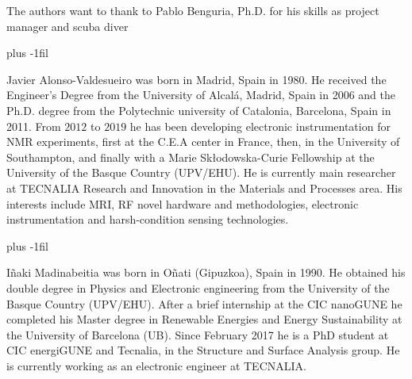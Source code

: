 \documentclass[journal,twoside,web]{ieeecolor}
\begin{document}
The authors want to thank to Pablo Benguria, Ph.D. for his skills as project manager and scuba diver







\baselineskip plus -1fil
\begin{IEEEbiography}{Javier Alonso-Valdesueiro}
was born in Madrid, Spain in 1980. He received the Engineer's Degree from the University of Alcalá, Madrid, Spain in 2006 and the Ph.D. degree from the Polytechnic university of Catalonia, Barcelona, Spain in 2011.
From $2012$ to $2019$ he has been developing electronic instrumentation for NMR experiments, first at the C.E.A center in France, then, in the University of Southampton, and finally with a Marie Skłodowska-Curie Fellowship at the University of the Basque Country (UPV/EHU). He is currently main researcher at TECNALIA Research and Innovation in the Materials and Processes area.  His interests include MRI, RF novel hardware and methodologies, electronic instrumentation and harsh-condition sensing technologies.
\end{IEEEbiography}
\baselineskip plus -1fil
\begin{IEEEbiography}{Iñaki Madinabeitia}
was born in Oñati (Gipuzkoa), Spain in 1990. He obtained his double degree in Physics and Electronic engineering from the University of the Basque Country (UPV/EHU). After a brief internship at the CIC nanoGUNE he completed his Master degree in Renewable Energies and Energy Sustainability at the University of Barcelona (UB). Since February 2017 he is a PhD student at CIC energiGUNE and Tecnalia, in the Structure and Surface Analysis group. He is currently working as an electronic engineer at TECNALIA.
\end{IEEEbiography}
\end{document}
